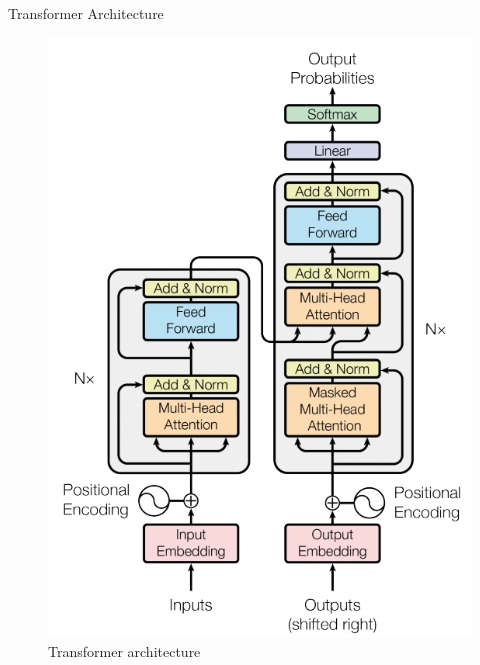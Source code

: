 \documentclass[final]{beamer}
\newlength{\onecolwid}
\newlength{\twocolwid}
\begin{document}
\begin{frame}[t]
\begin{columns}[t]
\begin{column}{\twocolwid}
\begin{columns}[t,totalwidth=\twocolwid]
\begin{column}{\onecolwid}\vspace{-.6in} %

\begin{block}{Transformer Architecture}
    \begin{figure}
    \includegraphics[clip,scale=0.88]{transformer.png}
    \caption{Transformer architecture}
    \end{figure}


\end{block}
\end{column}
\end{columns}
\end{column}
\end{columns}
\end{frame}
\end{document}
